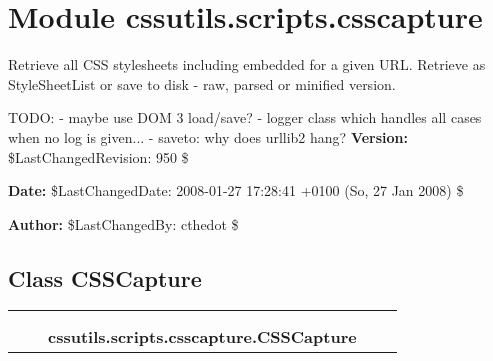 %
%
%


\section{Module cssutils.scripts.csscapture}

    \label{cssutils:scripts:csscapture}

Retrieve all CSS stylesheets including embedded for a given URL.
Retrieve as StyleSheetList or save to disk - raw, parsed or minified version.

TODO:
- maybe use DOM 3 load/save?
- logger class which handles all cases when no log is given...
- saveto: why does urllib2 hang?
\textbf{Version:} \$LastChangedRevision: 950 \$



\textbf{Date:} \$LastChangedDate: 2008-01-27 17:28:41 +0100 (So, 27 Jan 2008) \$



\textbf{Author:} \$LastChangedBy: cthedot \$





\subsection{Class CSSCapture}

    \label{cssutils:scripts:csscapture:CSSCapture}
\begin{tabular}{cccccc}
\multicolumn{2}{r}{\settowidth{\BCL}{object}\multirow{2}{\BCL}{object}}
&&
  \\\cline{3-3}
  &&\multicolumn{1}{c|}{}
&&
  \\
&&\multicolumn{2}{l}{\textbf{cssutils.scripts.csscapture.CSSCapture}}
\end{tabular}


